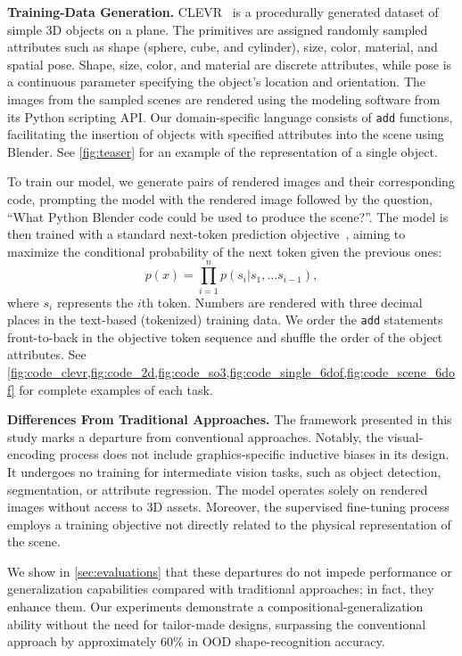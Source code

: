 \noindent\textbf{Training-Data Generation.}
CLEVR~\citep{johnson2017clevr} is a procedurally generated dataset of simple 3D objects on a plane.
The primitives are assigned randomly sampled attributes such as shape (sphere, cube, and cylinder), size, color, material, and spatial pose.
Shape, size, color, and material are discrete attributes, while pose is a continuous parameter specifying the object's location and orientation.
The images from the sampled scenes are rendered using the \citet{blender} modeling software from its Python scripting API.
Our domain-specific language consists of \texttt{add} functions, facilitating the insertion of objects with specified attributes into the scene using Blender.
See \cref{fig:teaser} for an example of the representation of a single object.

To train our model, we generate pairs of rendered images and their corresponding code, prompting the model with the rendered image followed by the question, ``What Python Blender code could be used to produce the scene?''.
The model is then trained with a standard next-token prediction objective~\citep{bengio_plm}, aiming to maximize the conditional probability of the next token given the previous ones:
\begin{equation}\label{eq:next-token}
p(x) = \prod_{i=1}^n p\left(s_i|s_1,\ldots s_{i-1}\right) ,
\end{equation}
where $s_i$ represents the $i$th token.
Numbers are rendered with three decimal places in the text-based (tokenized) training data.
We order the \texttt{add} statements front-to-back in the objective token sequence and shuffle the order of the object attributes.
See \cref{fig:code_clevr,fig:code_2d,fig:code_so3,fig:code_single_6dof,fig:code_scene_6dof} for complete examples of each task.

\noindent\textbf{Differences From Traditional Approaches.}
The framework presented in this study marks a departure from conventional approaches.
Notably, the visual-encoding process does not include graphics-specific inductive biases in its design.
It undergoes no training for intermediate vision tasks, such as object detection, segmentation, or attribute regression.
The model operates solely on rendered images without access to 3D assets.
Moreover, the supervised fine-tuning process employs a training objective not directly related to the physical representation of the scene.

We show in \cref{sec:evaluations} that these departures do not impede performance or generalization capabilities compared with traditional approaches; in fact, they enhance them.
Our experiments demonstrate a compositional-generalization ability without the need for tailor-made designs, surpassing the conventional approach by approximately 60\% in OOD shape-recognition accuracy.

